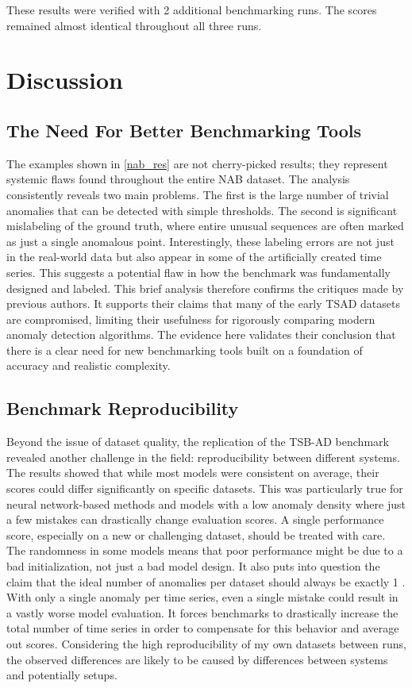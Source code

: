 \documentclass[12pt,oneside]{article}
\begin{document}
These results were verified with 2 additional benchmarking runs. The scores remained almost identical throughout all three runs.

\section{Discussion}

\subsection{The Need For Better Benchmarking Tools}

The examples shown in \ref{nab_res} are not cherry-picked results; they represent systemic flaws found throughout the entire NAB dataset. The analysis consistently reveals two main problems. The first is the large number of trivial anomalies that can be detected with simple thresholds. The second is significant mislabeling of the ground truth, where entire unusual sequences are often marked as just a single anomalous point.
Interestingly, these labeling errors are not just in the real-world data but also appear in some of the artificially created time series. This suggests a potential flaw in how the benchmark was fundamentally designed and labeled.
This brief analysis therefore confirms the critiques made by previous authors. It supports their claims that many of the early TSAD datasets are compromised, limiting their usefulness for rigorously comparing modern anomaly detection algorithms. The evidence here validates their conclusion that there is a clear need for new benchmarking tools built on a foundation of accuracy and realistic complexity.

\subsection{Benchmark Reproducibility}

Beyond the issue of dataset quality, the replication of the TSB-AD benchmark revealed another challenge in the field: reproducibility between different systems. The results showed that while most models were consistent on average, their scores could differ significantly on specific datasets. This was particularly true for neural network-based methods and models with a low anomaly density where just a few mistakes can drastically change evaluation scores. A single performance score, especially on a new or challenging dataset, should be treated with care. The randomness in some models means that poor performance might be due to a bad initialization, not just a bad model design. It also puts into question the claim that the ideal number of anomalies per dataset should always be exactly 1 \parencite[p.~4]{wu2021current}. With only a single anomaly per time series, even a single mistake could result in a vastly worse model evaluation. It forces benchmarks to drastically increase the total number of time series in order to compensate for this behavior and average out scores. Considering the high reproducibility of my own datasets between runs, the observed differences are likely to be caused by differences between systems and potentially setups.
\end{document}
